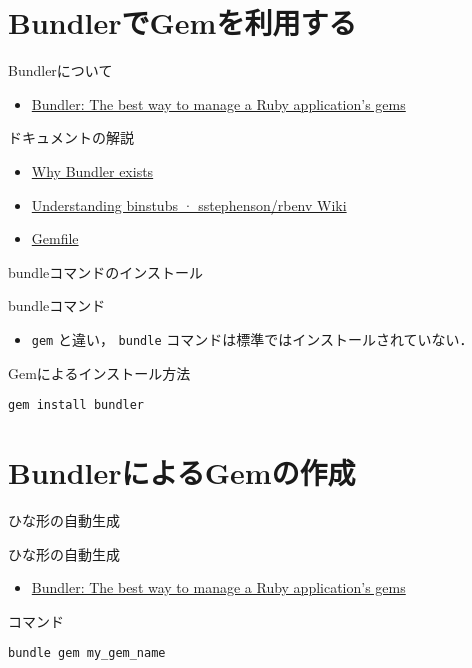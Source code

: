 \documentclass[t, aspectratio=169]{beamer}
\begin{document}
\section{BundlerでGemを利用する}
\label{sec-4-2}
\begin{frame}[label=sec-4-2-1]{Bundlerについて}
\begin{itemize}
\item \href{http://bundler.io/}{Bundler: The best way to manage a Ruby application's gems}
\end{itemize}
\end{frame}
\begin{frame}[label=sec-4-2-2]{ドキュメントの解説}
\begin{itemize}
\item \href{http://bundler.io/rationale.html}{Why Bundler exists}
\item \href{https://github.com/sstephenson/rbenv/wiki/Understanding-binstubs}{Understanding binstubs · sstephenson/rbenv Wiki}
\item \href{http://bundler.io/gemfile.html}{Gemfile}
\end{itemize}
\end{frame}
\begin{frame}[fragile,label=sec-4-2-3]{bundleコマンドのインストール}
 \begin{block}{bundleコマンド}
\begin{itemize}
\item \texttt{gem} と違い， \texttt{bundle} コマンドは標準ではインストールされていない．
\end{itemize}
\end{block}
\begin{block}{Gemによるインストール方法}
\begin{verbatim}
gem install bundler
\end{verbatim}
\end{block}
\end{frame}

\section{BundlerによるGemの作成}
\label{sec-4-3}
\begin{frame}[fragile,label=sec-4-3-1]{ひな形の自動生成}
 \begin{block}{ひな形の自動生成}
\begin{itemize}
\item \href{http://bundler.io/v1.7/bundle_gem.html}{Bundler: The best way to manage a Ruby application's gems}
\end{itemize}
\end{block}
\begin{block}{コマンド}
\begin{verbatim}
bundle gem my_gem_name
\end{verbatim}
\end{block}
\end{frame}
\end{document}
